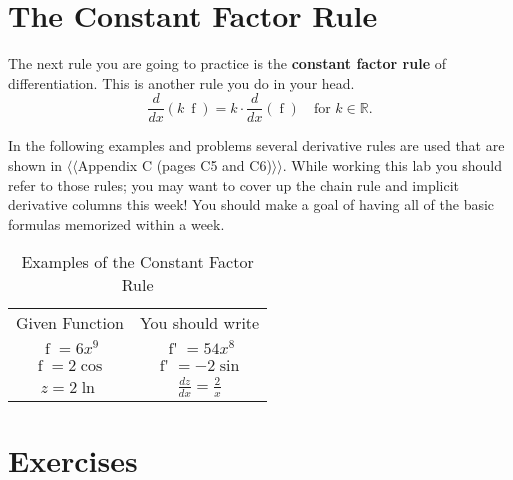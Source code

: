 \documentclass[12pt,]{book}
\newcommand{\terminology}[1]{\textbf{#1}}
\theoremstyle{plain}
\theoremstyle{definition}
\numberwithin{equation}{section}
\newcommand{\hrulemedium}{\noalign{\hrule height 0.07em}}
\newcommand{\hrulethick} {\noalign{\hrule height 0.11em}}
\newcommand{\reals}{\mathbb{R}}
\newcommand{\fe}[2]{\mathop{{#1}{\left(#2\right)}}}
\newcommand{\fd}[1]{#1'}
\newcommand{\lz}[2]{\frac{d#1}{d#2}}
\newcommand{\lzoo}[2]{{\frac{d}{d#1}}{\left(#2\right)}}
\begin{document}
\section[The Constant Factor Rule]{The Constant Factor Rule}\label{section-constant-factor-rule}
The next rule you are going to practice is the \terminology{constant factor rule} of differentiation.  This is another rule you do in your head. \begin{equation}\lzoo{x}{k\ \fe{f}{x}}=k\cdot\lzoo{x}{\fe{f}{x}}\quad\text{for }k\in\reals\text{.}\label{men-3}\end{equation}%
\par
In the following examples and problems several derivative rules are used that are shown in {$\langle\langle$Appendix C (pages C5 and C6)$\rangle\rangle$}.  While working this lab you should refer to those rules; you may want to cover up the chain rule and implicit derivative columns this week!  You should make a goal of having all of the basic formulas memorized within a week.%
\begin{table}
\centering
\caption{Examples of the Constant Factor Rule\label{table-constant-factor-rule}}
\begin{tabular}{cc}\hrulethick
Given Function&You should write\\\hrulemedium
\(\fe{f}{x}=6x^9\)&\(\fe{\fd{f}}{x}=54x^8\)\\
\(\fe{f}{\theta}=2\fe{\cos}{\theta}\)&\(\fe{\fd{f}}{\theta}=-2\fe{\sin}{\theta}\)\\
\(z=2\fe{\ln}{x}\)&\(\lz{z}{x}=\frac{2}{x}\)
\end{tabular}
\end{table}
\typeout{************************************************}
\typeout{************************************************}
\section*{Exercises}\label{exercises-32}
\end{document}
